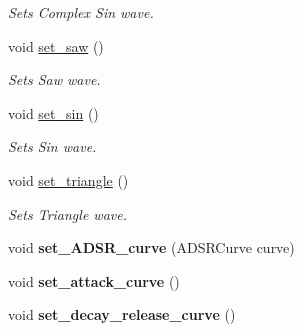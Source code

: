 \begin{DoxyCompactItemize}
\begin{DoxyCompactList}\small\item\em Sets Complex Sin wave. \end{DoxyCompactList}\item 
void \hyperlink{class_synth_audio_processor_a189c02e2f3acbfd708186dbc3bb0916e}{set\+\_\+saw} ()\hypertarget{class_synth_audio_processor_a189c02e2f3acbfd708186dbc3bb0916e}{}\label{class_synth_audio_processor_a189c02e2f3acbfd708186dbc3bb0916e}

\begin{DoxyCompactList}\small\item\em Sets Saw wave. \end{DoxyCompactList}\item 
void \hyperlink{class_synth_audio_processor_a3ab29ed5df1da4e3435888cf91a717b0}{set\+\_\+sin} ()\hypertarget{class_synth_audio_processor_a3ab29ed5df1da4e3435888cf91a717b0}{}\label{class_synth_audio_processor_a3ab29ed5df1da4e3435888cf91a717b0}

\begin{DoxyCompactList}\small\item\em Sets Sin wave. \end{DoxyCompactList}\item 
void \hyperlink{class_synth_audio_processor_a09fd2a9104013eaf78f61935f72b5ab8}{set\+\_\+triangle} ()\hypertarget{class_synth_audio_processor_a09fd2a9104013eaf78f61935f72b5ab8}{}\label{class_synth_audio_processor_a09fd2a9104013eaf78f61935f72b5ab8}

\begin{DoxyCompactList}\small\item\em Sets Triangle wave. \end{DoxyCompactList}\item 
void {\bfseries set\+\_\+\+A\+D\+S\+R\+\_\+curve} (A\+D\+S\+R\+Curve curve)\hypertarget{class_synth_audio_processor_a158672eb5ca30f0f138e1d58391fa242}{}\label{class_synth_audio_processor_a158672eb5ca30f0f138e1d58391fa242}

\item 
void {\bfseries set\+\_\+attack\+\_\+curve} ()\hypertarget{class_synth_audio_processor_ada3956c2332f0c156f57a20513c83c06}{}\label{class_synth_audio_processor_ada3956c2332f0c156f57a20513c83c06}

\item 
void {\bfseries set\+\_\+decay\+\_\+release\+\_\+curve} ()\hypertarget{class_synth_audio_processor_af89bb282d450985d3fd94ccfa2b80143}{}\label{class_synth_audio_processor_af89bb282d450985d3fd94ccfa2b80143}


\end{DoxyCompactItemize}
